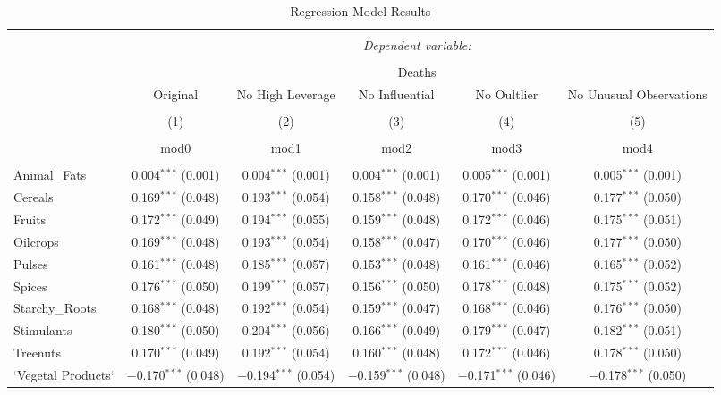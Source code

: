 \documentclass[
]{article}
\begin{document}
\begin{table}[!htbp] \centering 
  \caption{Regression Model Results} 
  \label{} 
\small 
\begin{tabular}{@{\extracolsep{-15pt}}lccccc} 
\\[-1.8ex]\hline 
\hline \\[-1.8ex] 
 & \multicolumn{5}{c}{\textit{Dependent variable:}} \\ 
\cline{2-6} 
\\[-1.8ex] & \multicolumn{5}{c}{Deaths} \\ 
 & Original & No High Leverage & No Influential & No Oultlier & No Unusual Observations \\ 
\\[-1.8ex] & (1) & (2) & (3) & (4) & (5)\\ 
\\[-1.8ex] & mod0 & mod1 & mod2 & mod3 & mod4\\ 
\hline \\[-1.8ex] 
 Animal\_Fats & 0.004$^{***}$ (0.001) & 0.004$^{***}$ (0.001) & 0.004$^{***}$ (0.001) & 0.005$^{***}$ (0.001) & 0.005$^{***}$ (0.001) \\ 
  Cereals & 0.169$^{***}$ (0.048) & 0.193$^{***}$ (0.054) & 0.158$^{***}$ (0.048) & 0.170$^{***}$ (0.046) & 0.177$^{***}$ (0.050) \\ 
  Fruits & 0.172$^{***}$ (0.049) & 0.194$^{***}$ (0.055) & 0.159$^{***}$ (0.048) & 0.172$^{***}$ (0.046) & 0.175$^{***}$ (0.051) \\ 
  Oilcrops & 0.169$^{***}$ (0.048) & 0.193$^{***}$ (0.054) & 0.158$^{***}$ (0.047) & 0.170$^{***}$ (0.046) & 0.177$^{***}$ (0.050) \\ 
  Pulses & 0.161$^{***}$ (0.048) & 0.185$^{***}$ (0.057) & 0.153$^{***}$ (0.048) & 0.161$^{***}$ (0.046) & 0.165$^{***}$ (0.052) \\ 
  Spices & 0.176$^{***}$ (0.050) & 0.199$^{***}$ (0.057) & 0.156$^{***}$ (0.050) & 0.178$^{***}$ (0.048) & 0.175$^{***}$ (0.052) \\ 
  Starchy\_Roots & 0.168$^{***}$ (0.048) & 0.192$^{***}$ (0.054) & 0.159$^{***}$ (0.047) & 0.168$^{***}$ (0.046) & 0.176$^{***}$ (0.050) \\ 
  Stimulants & 0.180$^{***}$ (0.050) & 0.204$^{***}$ (0.056) & 0.166$^{***}$ (0.049) & 0.179$^{***}$ (0.047) & 0.182$^{***}$ (0.051) \\ 
  Treenuts & 0.170$^{***}$ (0.049) & 0.192$^{***}$ (0.054) & 0.160$^{***}$ (0.048) & 0.172$^{***}$ (0.046) & 0.178$^{***}$ (0.050) \\ 
  `Vegetal Products` & $-$0.170$^{***}$ (0.048) & $-$0.194$^{***}$ (0.054) & $-$0.159$^{***}$ (0.048) & $-$0.171$^{***}$ (0.046) & $-$0.178$^{***}$ (0.050) \\ 

\end{tabular}
\end{table}
\end{document}
